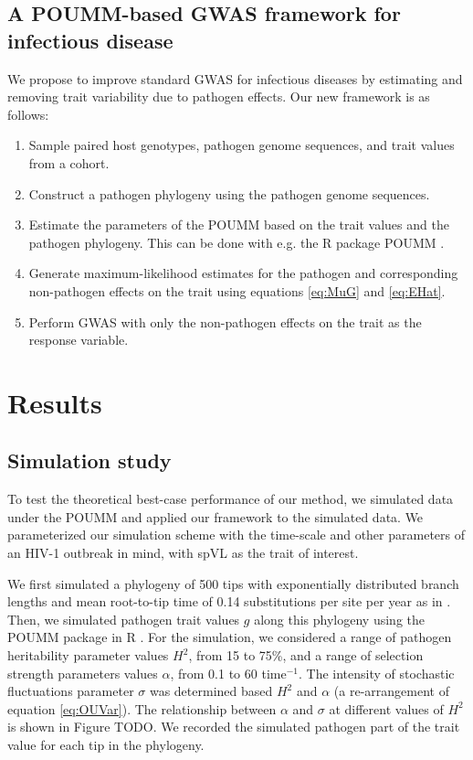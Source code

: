 \documentclass[11pt]{article}
\begin{document}
\begin{linenumbers}
\subsection*{A POUMM-based GWAS framework for infectious disease}

We propose to improve standard GWAS for infectious diseases by estimating and removing trait variability due to pathogen effects. Our new framework is as follows:

\begin{enumerate}
	\item Sample paired host genotypes, pathogen genome sequences, and trait values from a cohort.
	\item Construct a pathogen phylogeny using the pathogen genome sequences.
	\item Estimate the parameters of the POUMM based on the trait values and the pathogen phylogeny. This can be done with e.g. the R package POUMM \citep{Mitov2017a-POUMM}.
	\item Generate maximum-likelihood estimates for the pathogen and corresponding non-pathogen effects on the trait using equations \ref{eq:MuG} and \ref{eq:EHat}.
	\item Perform GWAS with only the non-pathogen effects on the trait as the response variable.
\end{enumerate}

\section*{Results}

\subsection*{Simulation study}

To test the theoretical best-case performance of our method, we simulated data under the POUMM and applied our framework to the simulated data. We parameterized our simulation scheme with the time-scale and other parameters of an HIV-1 outbreak in mind, with spVL as the trait of interest. 

We first simulated a phylogeny of 500 tips with exponentially distributed branch lengths and mean root-to-tip time of 0.14 substitutions per site per year as in \cite{Hodcroft2014}. Then, we simulated pathogen trait values $g$ along this phylogeny using the POUMM package in R \citep{Mitov2017a-POUMM}. For the simulation, we considered a range of pathogen heritability parameter values $H^2$, from 15 to 75\%, and a range of selection strength parameters values $\alpha$, from 0.1 to 60 time$^{-1}$. The intensity of stochastic fluctuations parameter $\sigma$ was determined based $H^2$ and $\alpha$ (a re-arrangement of equation \ref{eq:OUVar}). The relationship between $\alpha$ and $\sigma$ at different values of $H^2$ is shown in Figure TODO. We recorded the simulated pathogen part of the trait value for each tip in the phylogeny.


\end{linenumbers}
\end{document}
